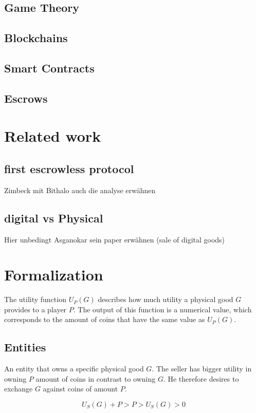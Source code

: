 \documentclass{cacthesis}
\begin{document}
\section{Game Theory}
\section{Blockchains}
\section{Smart Contracts}
\section{Escrows}

\chapter{Related work}
\section{first escrowless protocol}
Zimbeck mit Bithalo
auch die analyse erwähnen
\section{digital vs Physical}
Hier unbedingt Asganokar sein paper erwähnen (sale of digital goods)

\chapter{Formalization}
The utility function $U_P(G)$ describes how much utility a physical good $G$ provides to a player $P$. The output of this function is a numerical value, which corresponds to the amount of coins that have the same value as $U_P(G)$.
\section{Entities}

An entity that owns a specific physical good $G$. The seller has bigger utility in owning $P$ amount of coins in contrast to owning $G$. He therefore desires to exchange $G$ against coins of amount $P$.

\begin{equation}
    U_S(G) + P > P > U_S(G) > 0
\end{equation}
\end{document}
